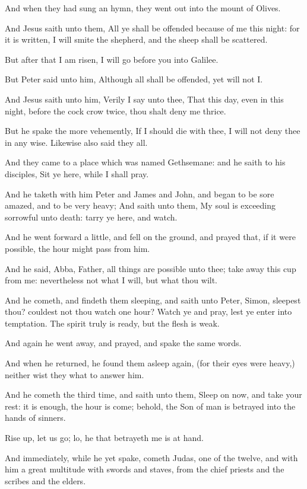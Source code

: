 \Verse And when they had sung an hymn, they went out into the mount of Olives.

\Verse And Jesus saith unto them, All ye shall be offended because of me this night: for it is written, I will smite the shepherd, and the sheep shall be scattered.

\Verse But after that I am risen, I will go before you into Galilee.

\Verse But Peter said unto him, Although all shall be offended, yet will not I.

\Verse And Jesus saith unto him, Verily I say unto thee, That this day, even in this night, before the cock crow twice, thou shalt deny me thrice.

\Verse But he spake the more vehemently, If I should die with thee, I will not deny thee in any wise. Likewise also said they all.

\Verse And they came to a place which was named Gethsemane: and he saith to his disciples, Sit ye here, while I shall pray.

\Verse And he taketh with him Peter and James and John, and began to be sore amazed, and to be very heavy; \Verse And saith unto them, My soul is exceeding sorrowful unto death: tarry ye here, and watch.

\Verse And he went forward a little, and fell on the ground, and prayed that, if it were possible, the hour might pass from him.

\Verse And he said, Abba, Father, all things are possible unto thee; take away this cup from me: nevertheless not what I will, but what thou wilt.

\Verse And he cometh, and findeth them sleeping, and saith unto Peter, Simon, sleepest thou? couldest not thou watch one hour?  \Verse Watch ye and pray, lest ye enter into temptation. The spirit truly is ready, but the flesh is weak.

\Verse And again he went away, and prayed, and spake the same words.

\Verse And when he returned, he found them asleep again, (for their eyes were heavy,) neither wist they what to answer him.

\Verse And he cometh the third time, and saith unto them, Sleep on now, and take your rest: it is enough, the hour is come; behold, the Son of man is betrayed into the hands of sinners.

\Verse Rise up, let us go; lo, he that betrayeth me is at hand.

\Verse And immediately, while he yet spake, cometh Judas, one of the twelve, and with him a great multitude with swords and staves, from the chief priests and the scribes and the elders.

